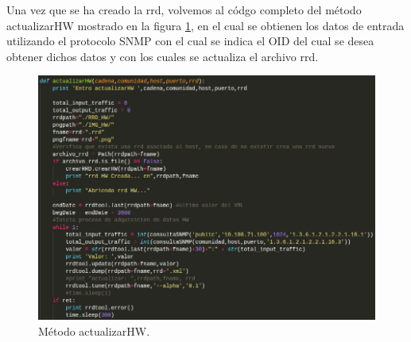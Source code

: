 Una vez que se ha creado la rrd, volvemos al códgo completo del método actualizarHW mostrado en la figura \ref{image:codigo3}, en el cual se obtienen los datos de entrada utilizando el protocolo SNMP con el cual se indica el OID del cual se desea obtener dichos datos y con los cuales se actualiza el archivo rrd.
\FloatBarrier
\begin{figure}[htbp!]
		\centering
			\includegraphics[width=1 \textwidth]{images/codigo3}
		\caption{Método actualizarHW.}
		\label{image:codigo3}
\end{figure}
\FloatBarrier

